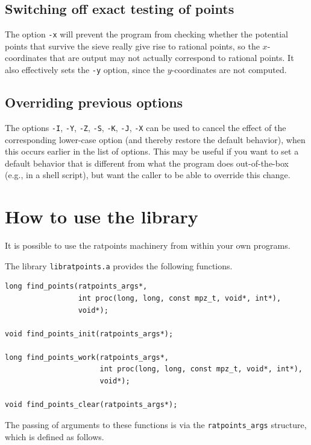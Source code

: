 \documentclass[12pt,a4paper,oneside]{amsart}
\begin{document}
\subsection{Switching off exact testing of points}

The option \verb+-x+ will prevent the program from checking whether the
potential points that survive the sieve really give rise to rational
points, so the $x$-coordinates that are output may not actually correspond
to rational points. It also effectively sets the \verb+-y+ option, since the
$y$-coordinates are not computed.

\subsection{Overriding previous options}

The options \verb+-I+, \verb+-Y+, \verb+-Z+, \verb+-S+, \verb+-K+, \verb+-J+,
\verb+-X+ can be used to cancel the effect of the corresponding lower-case
option (and thereby restore the default behavior),
when this occurs earlier in the list of options. This may be useful if
you want to set a default behavior that is different from what the
program does out-of-the-box (e.g., in a shell script), but want the caller
to be able to override this change.


\section{How to use the library}\label{sec:library}

It is possible to use the ratpoints machinery from within your own programs.

The library \texttt{libratpoints.a} provides the following functions.

\begin{verbatim}
long find_points(ratpoints_args*,
                 int proc(long, long, const mpz_t, void*, int*),
                 void*);

void find_points_init(ratpoints_args*);

long find_points_work(ratpoints_args*,
                      int proc(long, long, const mpz_t, void*, int*),
                      void*);

void find_points_clear(ratpoints_args*);
\end{verbatim}

The passing of arguments to these functions is via the \texttt{ratpoints\_args}
structure, which is defined as follows.
\end{document}
